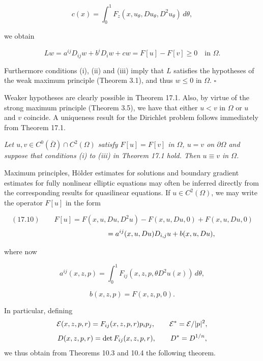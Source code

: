 \[
c(x)=\int_{0}^{1}F_{z}(x,u_{\theta},Du_{\theta},D^{2}u_{\theta})\,d\theta,
\]

we obtain

\[
Lw=a^{ij}D_{ij}w+b^{i}D_{i}w+cw
=F[u]-F[v]\ge 0 \quad \text{in } \Omega.
\]

Furthermore conditions (i), (ii) and (iii) imply that $L$ satisfies the hypotheses of the
weak maximum principle (Theorem 3.1), and thus $w\le 0$ in $\Omega$. $\square$

\medskip

Weaker hypotheses are clearly possible in Theorem 17.1. Also, by virtue of the
strong maximum principle (Theorem 3.5), we have that either $u<v$ in $\Omega$ or $u$ and $v$
coincide. A uniqueness result for the Dirichlet problem follows immediately from
Theorem 17.1.

\medskip

\begin{corollary}[Corollary 17.2]\label{gt-ch17-cor-17-2}
\textit{Let $u, v\in C^{0}(\bar{\Omega})\cap C^{2}(\Omega)$ satisfy $F[u]=F[v]$ in $\Omega$, $u=v$ on $\partial\Omega$
and suppose that conditions (i) to (iii) in Theorem 17.1 hold. Then $u\equiv v$ in $\Omega$.}
\end{corollary}

\medskip

Maximum principles, H\"older estimates for solutions and boundary gradient
estimates for fully nonlinear elliptic equations may often be inferred directly from
the corresponding results for quasilinear equations. If $u\in C^{2}(\Omega)$, we may write the
operator $F[u]$ in the form

\[
(17.10)\qquad F[u]=F(x,u,Du,D^{2}u)-F(x,u,Du,0)+F(x,u,Du,0)
\]
\[
\hspace{2.9cm}=a^{ij}(x,u,Du)D_{i,j}u+b(x,u,Du),
\]

where now

\[
a^{ij}(x,z,p)=\int_{0}^{1}F_{ij}(x,z,p,\theta D^{2}u(x))\,d\theta,
\]

\[
b(x,z,p)=F(x,z,p,0).
\]




In particular, defining
\[
\mathcal{E}(x, z, p, r) = F_{ij}(x, z, p, r)p_i p_j,
\qquad
\mathcal{E}^* = \mathcal{E}/|p|^2,
\]
\[
D(x, z, p, r) = \det F_{ij}(x, z, p, r),
\qquad
D^* = D^{1/n},
\]
we thus obtain from Theorems 10.3 and 10.4 the following theorem.

\medskip


